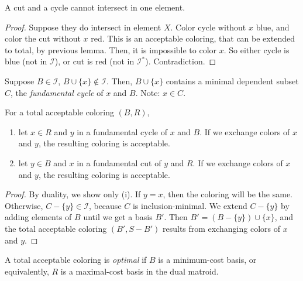 \begin{mylemma}
A cut and a cycle cannot intersect in one element.
\end{mylemma}
\begin{proof}
Suppose they do intersect in element $X$. Color cycle without $x$ blue, and color the cut without $x$ red. This is an acceptable coloring, that can be extended to total, by previous lemma. Then, it is impossible to color $x$. So either cycle is blue (not in $\mathcal{I}$), or cut is red (not in $\mathcal{I}^*$). Contradiction.
\end{proof}

\begin{mydefinition}
Suppose $B \in \mathcal{I}$, $ B \cup \{x\} \notin \mathcal{I}$. Then, $B \cup \{x\}$ contains a minimal dependent subset $C$, the \emph{fundamental cycle} of $x$ and $B$. Note: $x \in C$.
\end{mydefinition}

\begin{mylemma}
For a total acceptable coloring $(B,R)$,
\begin{enumerate}
\item let $x \in R$ and $y$ in a fundamental cycle of $x$ and $B$. If we exchange colors of $x$ and $y$, the resulting coloring is acceptable.
\item let $y \in B$ and $x$ in a fundamental cut of $y$ and $R$. If we exchange colors of $x$ and $y$, the resulting coloring is acceptable.
\end{enumerate}
\end{mylemma}
\begin{proof}
By duality, we show only (i). If $y = x$, then the coloring will be the same. Otherwise, $C - \{y\} \in \mathcal{I}$, because $C$ is inclusion-minimal. We extend $C - \{y\}$ by adding elements of $B$ until we get a basis $B'$. Then $B' = (B - \{y\}) \cup \{x\}$, and the total acceptable coloring $(B', S-B')$ results from exchanging colors of $x$ and $y$.
\end{proof}

\begin{mydefinition}
A total acceptable coloring is \emph{optimal} if $B$ is a minimum-cost basis, or equivalently, $R$ is a maximal-cost basis in the dual matroid.
\end{mydefinition}

